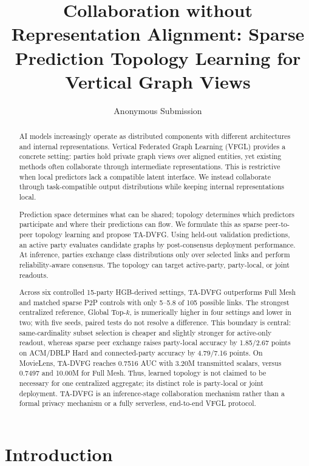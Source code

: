 \documentclass[letterpaper]{article} %
\title{Collaboration without Representation Alignment: Sparse Prediction Topology Learning for Vertical Graph Views}
\author{Anonymous Submission}
\newcommand{\method}{\textsc{TA-DVFG}}
\begin{document}
\maketitle

\begin{abstract}
AI models increasingly operate as distributed components with different
architectures and internal representations. Vertical Federated Graph Learning
(VFGL) provides a concrete setting: parties hold private graph views over
aligned entities, yet existing methods often collaborate through intermediate
representations. This is restrictive when local predictors lack a compatible
latent interface. We instead collaborate through task-compatible output
distributions while keeping internal representations local.

Prediction space determines what can be shared; topology determines which
predictors participate and where their predictions can flow. We formulate this
as sparse peer-to-peer topology learning and propose \method{}. Using held-out
validation predictions, an active party evaluates candidate graphs by
post-consensus deployment performance. At inference, parties exchange class
distributions only over selected links and perform reliability-aware consensus.
The topology can target active-party, party-local, or joint readouts.

Across six controlled 15-party HGB-derived settings, \method{} outperforms Full
Mesh and matched sparse P2P controls with only 5--5.8 of 105 possible links.
The strongest centralized reference, Global Top-$k$, is numerically higher in
four settings and lower in two; with five seeds, paired tests do not resolve a
difference. This boundary is central: same-cardinality subset selection is
cheaper and slightly stronger for active-only readout, whereas sparse peer
exchange raises party-local accuracy by 1.85/2.67 points on ACM/DBLP Hard and
connected-party accuracy by 4.79/7.16 points. On MovieLens, \method{} reaches
0.7516 AUC with 3.20M transmitted scalars, versus 0.7497 and 10.00M for Full
Mesh. Thus, learned topology is not claimed to be necessary for one centralized
aggregate; its distinct role is party-local or joint deployment. \method{} is
an inference-stage collaboration mechanism rather than a formal privacy
mechanism or a fully serverless, end-to-end VFGL protocol.
\end{abstract}

\section{Introduction}
\end{document}
